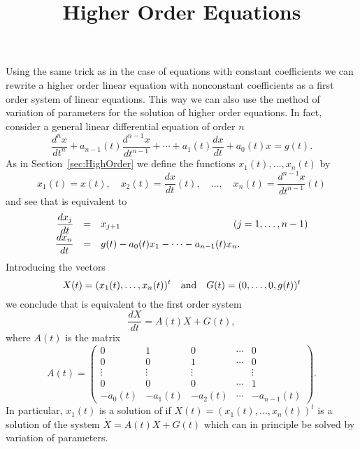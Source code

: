 \documentclass{ximera}
\title{Higher Order Equations}
\begin{document}
\begin{abstract}
\end{abstract}
\maketitle


\label{S:RO}

Using the same trick as in the case of equations with constant 
coefficients we can rewrite a higher order linear equation with
nonconstant coefficients as a first order system of linear
equations.  This way we can also use the method of variation 
of parameters for the solution of higher order equations.  
In fact, consider a general linear differential equation of 
order $n$
\begin{equation}
\label{E:noncc}
\frac{d^nx}{dt^n} + a_{n-1}(t)\frac{d^{n-1}x}{dt^{n-1}} +\cdots + 
a_1(t)\frac{dx}{dt}+a_0(t)x = g(t).
\end{equation}
As in Section~\ref{sec:HighOrder} we define the functions
$x_1(t),\ldots,x_n(t)$ by
\[
x_1(t)=x(t),\quad x_2(t)=\frac{dx}{dt}(t),\quad
\ldots, \quad  x_n(t)=\frac{d^{n-1}x}{dt^{n-1}}(t)
\]
and see that  is equivalent to
\arraystart
\[
\begin{array}{rcl}
\displaystyle \frac{dx_j}{dt}&=&x_{j+1} \hspace{1.6in} (j=1,\ldots,n-1)\\
\displaystyle \frac{dx_n}{dt}&=& g(t) - a_0(t)x_1 - \cdots - a_{n-1}(t) x_n.
\end{array}
\]
\arrayfinish
Introducing the vectors
\[
X(t) = (x_1(t),\ldots,x_n(t))^t  \quad\mbox{and}\quad
G(t) = (0,\ldots,0,g(t))^t
\]
we conclude that  is equivalent to the 
first order system
\[
\frac{dX}{dt} = A(t)X+G(t),
\]
where $A(t)$ is the matrix
\[
A(t) = \left(\begin{array}{ccccc}
0 & 1 & 0 & \cdots & 0\\
0 & 0 & 1 & \cdots & 0\\
\vdots & \vdots & \vdots & & \vdots\\
0 & 0 & 0 & \cdots & 1\\
-a_0(t) & -a_1(t) &  -a_2(t) & \cdots & -a_{n-1}(t)
\end{array}\right).
\]
In particular, $x_1(t)$ is a solution of  if 
$X(t)=(x_1(t),\ldots,x_n(t))^t$ is a solution of the system
$\dot X = A(t)X+G(t)$ which can in principle be solved by
variation of parameters.
\end{document}
